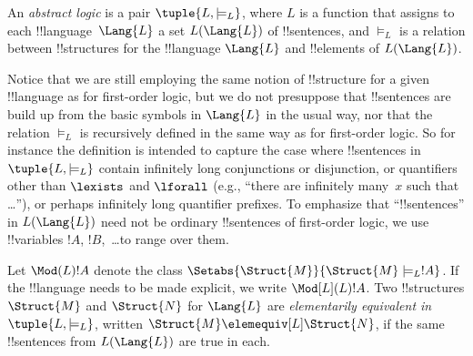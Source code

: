 \documentclass[../../include/open-logic-section]{subfiles}
\begin{document}

\begin{defn}
An \emph{abstract logic} is a pair $\tuple{L, \models_L}$, where $L$ is a
function that assigns to each !!{language}~$\Lang{L}$ a set
$L(\Lang{L})$ of !!{sentence}s, and $\models_L$ is a relation between
!!{structure}s for the !!{language} $\Lang{L}$ and !!{element}s of
$L(\Lang{L})$.
\end{defn}

Notice that we are still employing the same notion of !!{structure} for a
given !!{language} as for first-order logic, but we do not presuppose
that !!{sentence}s are build up from the basic symbols in $\Lang{L}$
in the usual way, nor that the relation $\models_L$ is recursively
defined in the same way as for first-order logic. So for instance the
definition is intended to capture the case where !!{sentence}s in
$\tuple{L,\models_L}$ contain infinitely long conjunctions or disjunction,
or quantifiers other than $\lexists$ and $\lforall$ (e.g., ``there are
infinitely many~$x$ such that \dots''), or perhaps infinitely long
quantifier prefixes. To emphasize that ``!!{sentence}s'' in
$L(\Lang{L})$ need not be ordinary !!{sentence}s of first-order logic,
we use !!{variable}s $!A$, $!B$,~\dots to range over them.

\begin{defn}
Let $\Mod(L){!A}$ denote the class $\Setabs{\Struct{M}}{\Struct{M}
  \models_L !A}$. If the !!{language} needs to be made explicit, we
write $\Mod[L](L){!A}$. Two !!{structure}s $\Struct{M}$ and
$\Struct{N}$ for $\Lang{L}$ are \emph{elementarily equivalent in}
$\tuple{L, \models_L}$, written $\Struct{M} \elemequiv[L] \Struct{N}$, if
the same !!{sentence}s from $L(\Lang{L})$ are true in each.
\end{defn}
\end{document}
